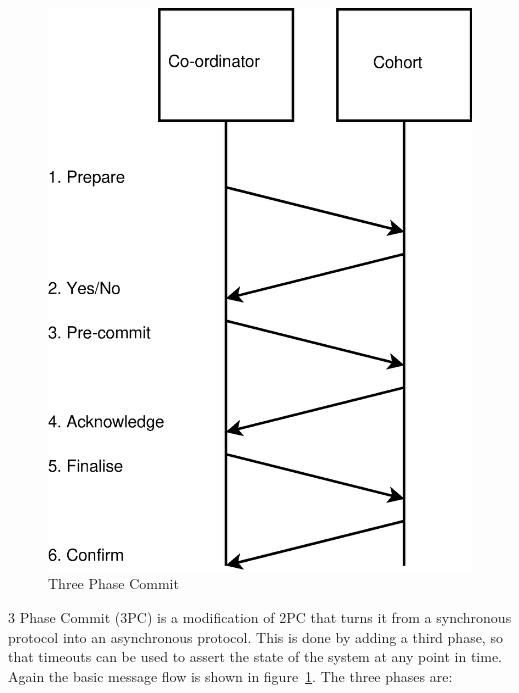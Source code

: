 \documentclass[12pt,twoside,notitlepage]{report}
\begin{document}
\begin{figure}[h!]
\centering
\includegraphics[scale=0.5]{figs/three-pc.eps}
\caption{\label{fig:three-pc}Three Phase Commit}
\end{figure}

3 Phase Commit (3PC) is a modification of 2PC that turns it from a synchronous protocol into an
asynchronous protocol. This is done by adding a third phase, so that timeouts can be used to assert
the state of the system at any point in time. Again the basic message flow is shown in
figure~\ref{fig:three-pc}. The three phases are:
\end{document}
